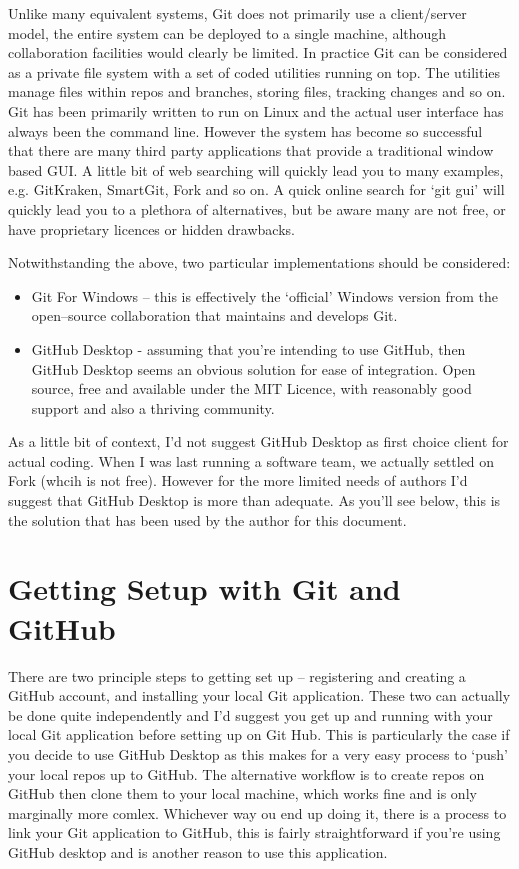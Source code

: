 \documentclass[a4paper, 12pt]{article}
\begin{document}
Unlike many equivalent systems, Git does not primarily use a client/server model, the entire system can be deployed to a single machine, although collaboration facilities would clearly be limited. In practice Git can be considered as a private file system with a set of coded utilities running on top. The utilities manage files within repos and branches, storing files, tracking changes and so on. Git has been primarily written to run on Linux and the actual user interface has always been the command line. However the system has become so successful that there are many third party applications that provide a traditional window based GUI. A little bit of web searching will quickly lead you to many examples, e.g. GitKraken, SmartGit, Fork and so on. A quick online search for `git gui' will quickly lead you to a plethora of alternatives, but be aware many are not free, or have proprietary licences or hidden drawbacks.

Notwithstanding the above, two particular implementations should be considered:
\begin{itemize}
\item Git For Windows -- this is effectively the `official' Windows version from the open--source collaboration that maintains and develops Git.
\item GitHub Desktop - assuming that you're intending to use GitHub, then GitHub Desktop seems an obvious solution for ease of integration. Open source, free and available under the MIT Licence, with reasonably good support and also a thriving community.
\end{itemize}
As a little bit of context, I'd not suggest GitHub Desktop as first choice client for actual coding. When I was last running a software team, we actually settled on Fork (whcih is not free). However for the more limited needs of authors I'd suggest that GitHub Desktop is more than adequate. As you'll see below, this is the solution that has been used by the author for this document.

\section{Getting Setup with Git and GitHub}
There are two principle steps to getting set up -- registering and creating a GitHub account, and installing your local Git application. These two can actually be done quite independently and I'd suggest you get up and running with your local Git application before setting up on Git Hub. This is particularly the case if you decide to use GitHub Desktop as this makes for a very easy process to `push' your local repos up to GitHub. The alternative workflow is to create repos on GitHub then clone them to your local machine, which works fine and is only marginally more comlex. Whichever way ou end up doing it, there is a process to link your Git application to GitHub, this is fairly straightforward if you're using GitHub desktop and is another reason to use this application.
\end{document}
